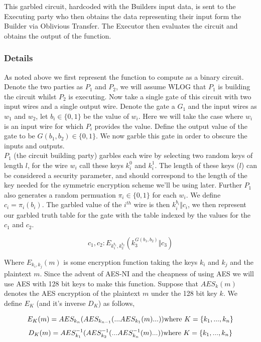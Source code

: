 \documentclass[a4paper,10pt]{article}
\begin{document}
				This garbled circuit, hardcoded with the Builders input data, is sent to the Executing party who then obtains the data representing their input form the Builder via Oblivious Transfer. The Executor then evaluates the circuit and obtains the output of the function.


			\subsubsection{Details} \label{Yao_Details}
				As noted above we first represent the function to compute as a binary circuit. Denote the two parties as $P_1$ and $P_2$, we will assume WLOG that $P_1$ is building the circuit whilst $P_2$ is executing. Now take a single gate of this circuit with two input wires and a single output wire. Denote the gate a $G_1$ and the input wires as $w_1$ and $w_2$, let $b_i \in \{0, 1\}$ be the value of $w_i$. Here we will take the case where $w_i$ is an input wire for which $P_i$ provides the value. Define the output value of the gate to be $G(b_1, b_2) \in \{0, 1\}$. We now garble this gate in order to obscure the inputs and outputs.\\

				$P_1$ (the circuit building party) garbles each wire by selecting two random keys of length $l$, for the wire $w_i$ call these keys $k_i^0$ and $k_i^1$. The length of these keys ($l$) can be considered a security parameter, and should correspond to the length of the key needed for the symmetric encryption scheme we'll be using later. Further $P_1$ also generates a random permuation $\pi_i \in \{0, 1\}$ for each $w_i$. We define $c_i = \pi_i(b_i)$. The garbled value of the $i^{th}$ wire is then $k_i^{b_i} \Vert c_i$, we then represent our garbled truth table for the gate with the table indexed by the values for the $c_1$ and $c_2$.

				$$ c_1, c_2 : E_{k_1^{b_1}, k_2^{b_2}} (k_3^{ G(b_1, b_2) } \Vert c_3) $$

				Where $E_{k_i, k_j}(m)$ is some encryption function taking the keys $k_i$ and $k_j$ and the plaintext $m$. Since the advent of AES-NI and the cheapness of using AES we will use AES with 128 bit keys to make this function. Suppose that $AES_k(m)$ denotes the AES encryption of the plaintext $m$ under the 128 bit key $k$. We define $E_K$ (and it's inverse $D_K$)  as follows,

				$$ E_K(m) = AES_{k_n}( AES_{k_{n-1}}( ...AES_{k_1}(m) ...) ) \textnormal{where } K = \{k_1, ..., k_n\}$$ 
				$$ D_K(m) = AES^{-1}_{k_1}( AES^{-1}_{k_{2}}( ...AES^{-1}_{k_n}(m) ...) ) \textnormal{where } K = \{k_1, ..., k_n\}$$ 
\end{document}
